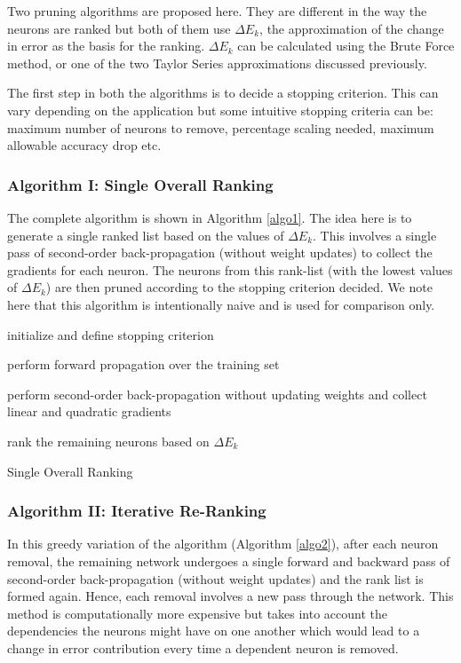Two pruning algorithms are proposed here. They are different in the way the neurons are ranked but both of them use $\Delta E_{k}$, the approximation of the change in error as the basis for the ranking. $\Delta E_{k}$ can be calculated using the Brute Force method, or one of the two Taylor Series approximations discussed previously.

The first step in both the algorithms is to  decide a stopping criterion. This can vary depending on the application but some intuitive stopping criteria can be: maximum number of neurons to remove, percentage scaling needed, maximum allowable accuracy drop etc. 

\subsubsection{Algorithm I: Single Overall Ranking}
The complete algorithm is shown in Algorithm \ref{algo1}. The idea here is to generate a single ranked list based on the values of $\Delta E_{k}$. This involves a single pass of second-order back-propagation (without weight updates) to collect the gradients for each neuron. The neurons from this rank-list (with the lowest values of $\Delta E_{k}$) are then pruned according to the stopping criterion decided. We note here that this algorithm is intentionally naive and is used for comparison only. 

\begin{algorithm}
 initialize and define stopping criterion \;
 
 perform forward propagation over the training set \;
 
  perform second-order back-propagation without updating weights and collect linear and quadratic gradients \;
  
  rank the remaining neurons based on $\Delta E_{k}$\;
  
 \caption{Single Overall Ranking}
 \label{algo1}
\end{algorithm}
 
\subsubsection{Algorithm II: Iterative Re-Ranking}

In this greedy variation of the algorithm (Algorithm \ref{algo2}), after each neuron removal, the remaining network undergoes a single forward and backward pass of second-order back-propagation (without weight updates) and the rank list is formed again. Hence, each removal involves a new pass through the network. This method is computationally more expensive but takes into account the dependencies the neurons might have on one another which would lead to a change in error contribution every time a dependent neuron is removed. 

